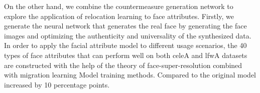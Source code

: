 {On the other hand, we combine the countermeasure generation network to explore the application of relocation learning to face attributes. Firstly, we generate the neural network that generates the real face by generating the face images and optimizing the authenticity and universality of the synthesized data. In order to apply the facial attribute model to different usage scenarios, the 40 types of face attributes that can perform well on both celeA and lfwA datasets are constructed with the help of the theory of face-super-resolution combined with migration learning Model training methods. Compared to the original model increased by 10 percentage points.
}

